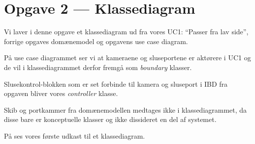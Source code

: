 \section{Opgave 2 --- Klassediagram}

Vi laver i denne opgave et klassediagram ud fra vores UC1: ``Passer fra lav side'', forrige opgaves domænemodel og opgavens use case diagram.

På use case diagrammet ser vi at kameraene og sluseportene er aktørere i UC1 og de vil i klassediagrammet derfor fremgå som \textit{boundary} klasser.

Slusekontrol-blokken som er set forbinde til kamera og sluseport i IBD fra opgaven bliver vores \textit{controller} klasse.

Skib og portkammer fra domænemodellen medtages ikke i klassediagrammet, da disse bare er konceptuelle klasser og ikke dissideret en del af systemet.

På  ses vores første udkast til et klassediagram.


